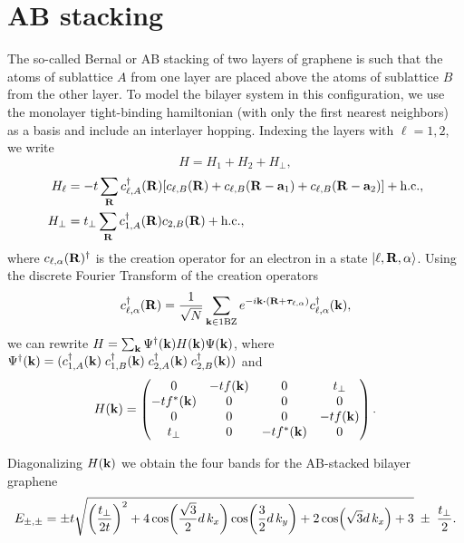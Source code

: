 \documentclass[a4paper,10pt]{article}
\begin{document}
\section{AB stacking}

The so-called Bernal or AB stacking of two layers of graphene is such that the atoms of sublattice $A$ from one layer are placed above the atoms of sublattice $B$ from the other layer.
To model the bilayer system in this configuration, we use the monolayer tight-binding hamiltonian (with only the first
nearest neighbors) as a basis and include an interlayer hopping. Indexing the layers with $\ell = 1, 2$, we write
\begin{equation} \label{eq:ab-hamil}
H = H_1 + H_2 + H_{\perp},
\end{equation}
\begin{equation} \label{eq:ab-slg-hamil}
\begin{split}
H_\ell &= -t \sum_{\vb{R}} c_{\ell,A}^\dagger(\vb{R}) [c_{\ell,B}(\vb{R}) + c_{\ell,B}(\vb{R}-\vb{a}_1) + c_{\ell,B}(\vb{R}-\vb{a}_2)] + \text{h.c.}, \\
H_\perp &= t_{\perp} \sum_{\vb{R}} c_{1,A}^\dagger(\vb{R}) c_{2,B}(\vb{R}) + \text{h.c.},
\end{split}
\end{equation}
where $c_{\ell,\alpha}(\vb{R})^\dagger$ is the creation operator for an electron in a state $\ket{\ell,\vb{R},\alpha}$. Using the discrete Fourier Transform of the creation operators
\begin{equation} \label{eq:ft-creatio}
c_{\ell,\alpha}^\d(\R) = \frac{1}{\sqrt{N}} \sum_{\k\in\text{1BZ}} e^{-i\k\vdot(\R+\bm{\tau}_{\ell,\alpha})} c_{\ell,\alpha}^\d(\k),
\end{equation}
we can rewrite $H = \sum_{\vb{k}} \Psi^\dagger(\vb{k}) H(\vb{k}) \Psi(\vb{k})$, where $\Psi^\dagger(\vb{k}) = (c_{1,A}^\dagger(\vb{k}) \; c_{1,B}^\dagger(\vb{k}) \; c_{2,A}^\dagger(\vb{k}) \; c_{2,B}^\dagger(\vb{k}))$ and
\begin{equation} \label{eq:ab-momentum_space}
H(\vb{k}) =
\begin{pmatrix}
0 & -t f(\vb{k}) & 0 & t_\perp \\
-t f^*(\vb{k}) & 0 & 0 & 0 \\
0 & 0 & 0 & -t f(\vb{k}) \\
t_\perp & 0 & -t f^*(\vb{k}) & 0 \\
\end{pmatrix}.
\end{equation}

Diagonalizing $H(\vb{k})$ we obtain the four bands for the AB-stacked bilayer graphene
\begin{equation} \label{eq:ab-four_bands}
E_{\pm,\pm} = \pm t
\sqrt{
\qty(\frac{t_\perp}{2t})^2 +
4 \cos(\frac{\sqrt{3}}{2} d \, k_x) \cos(\frac{3}{2} d \, k_y) + 2 \cos(\sqrt{3} d \, k_x) + 3
}
\; \pm \; \frac{t_\perp}{2}.
\end{equation}


%


\end{document}
